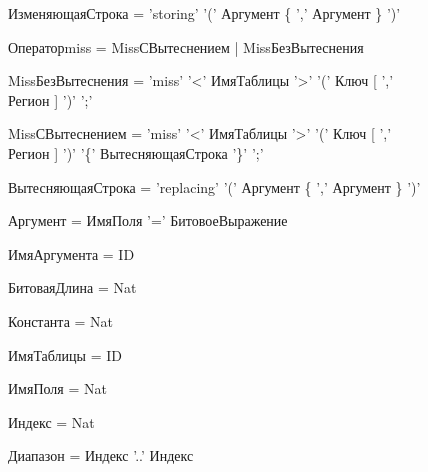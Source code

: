 {ИзменяющаяСтрока = 'storing' '('  Аргумент \{ ',' Аргумент \} ')'

Операторmiss = MissСВытеснением | MissБезВытеснения

MissБезВытеснения = 'miss' '<' ИмяТаблицы '>' '(' Ключ  [ ','\\ Регион ] ')' ';'

MissСВытеснением = 'miss' '<' ИмяТаблицы '>' '(' Ключ [ ',' \\ Регион ] ')' '\{' ВытесняющаяСтрока '\}' ';'

ВытесняющаяСтрока = 'replacing' '('  Аргумент \{ ',' Аргумент \} ')'

Аргумент = ИмяПоля '=' БитовоеВыражение

ИмяАргумента = ID

БитоваяДлина = Nat

Константа = Nat

ИмяТаблицы = ID

ИмяПоля = Nat

Индекс = Nat

Диапазон = Индекс '..' Индекс
} 